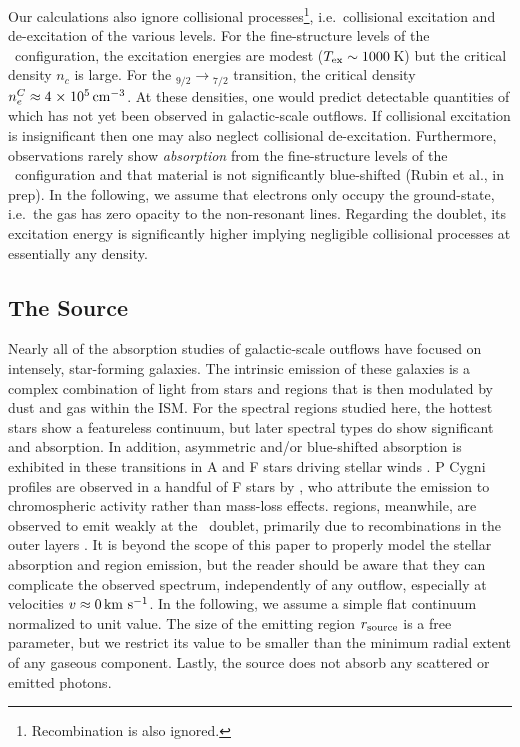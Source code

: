 \documentclass[]{emulateapj}
\begin{document}
Our calculations also ignore collisional
processes\footnote{Recombination is also ignored.}, i.e.\ collisional
excitation and de-excitation of the various levels.  For the
fine-structure levels of the \aconfig\ configuration, the excitation
energies are modest ($T_{\rm ex} \sim 1000$\,K) but the critical
density $n_c$ is large.  For the \aconfig$_{9/2} \to
$\aconfig$_{7/2}$ transition, the critical density $n_e^C \approx 4
{\; \times \; 10^{5}} \, {\rm cm^{-3}}$.  At these densities, one would predict  
detectable quantities of  which has not yet been observed
in galactic-scale outflows. 
If collisional excitation is insignificant 
then one may also neglect collisional de-excitation.  
Furthermore, observations rarely show
{\it absorption} from the
fine-structure levels of the \aconfig\ configuration and that material
is not significantly blue-shifted (Rubin et al., in prep). 
In the following, we assume that electrons only occupy the
ground-state, i.e.\ the gas has zero opacity to the non-resonant
lines.  
Regarding the  doublet, its
excitation energy is significantly higher implying 
negligible collisional processes at essentially any density.

\subsection{The Source}

Nearly all of the absorption studies of galactic-scale outflows 
have focused on intensely, star-forming galaxies.  The
intrinsic emission of these galaxies is a complex combination of
light from stars and  regions that is then modulated by dust and gas
within the ISM.  For the spectral regions studied
here, the hottest stars show a featureless continuum, but later spectral
types do show significant  and  absorption.
In addition, asymmetric and/or blue-shifted absorption is exhibited in these
transitions in A and F stars driving stellar winds \citep{sll+94}.
 P Cygni profiles are observed in a handful of F stars by \cite{sll+94}, who
attribute the emission to chromospheric activity rather than mass-loss effects.
 regions, meanwhile, are observed to emit weakly
at the \mgiid\ doublet, primarily due to recombinations in the outer
layers \citep{kbc+93}.
It is beyond the scope of this paper to
properly model the 
stellar absorption and  region emission, but the reader
should be aware that they can complicate the observed spectrum,
independently of any outflow, especially at velocities $v \approx 0 \, {\rm km~s^{-1}}$.
In the following, we assume a simple flat continuum 
normalized to unit value.  The size of the emitting
region $r_{\rm source}$ is a free parameter, but we restrict its value
to be smaller than the minimum radial extent of any gaseous
component.   Lastly, the source does not absorb any scattered or
emitted photons.
\end{document}
